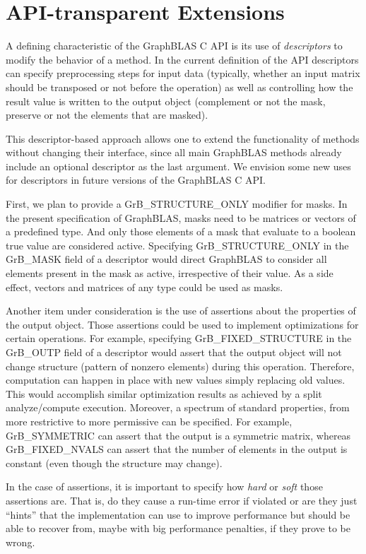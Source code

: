 \section{API-transparent Extensions}
\label{Sec:Extensions}

A defining characteristic of the GraphBLAS C API is its use of
\emph{descriptors} to modify the behavior of a method.  In the current
definition of the API descriptors can specify preprocessing steps for
input data (typically, whether an input matrix should be transposed or
not before the operation) as well as controlling how the result value
is written to the output object (complement or not the mask, preserve
or not the elements that are masked).

This descriptor-based approach allows one to extend the functionality of
methods without changing their interface, since all main GraphBLAS methods
already include an optional descriptor as the last argument. We envision
some new uses for descriptors in future versions of the GraphBLAS C API.

First, we plan to provide a {\sf GrB\_STRUCTURE\_ONLY} modifier for masks.
In the present specification of GraphBLAS, masks need to be matrices
or vectors of a predefined type. And only those elements of a mask
that evaluate to a boolean {\sf true} value are considered active.
Specifying {\sf GrB\_STRUCTURE\_ONLY} in the {\sf GrB\_MASK} field of
a descriptor would direct GraphBLAS to consider all elements present
in the mask as active, irrespective of their value.  As a side effect,
vectors and matrices of any type could be used as masks.

Another item under consideration is the use of assertions about the
properties of the output object. Those assertions could be used to
implement optimizations for certain operations. For example, specifying
{\sf GrB\_FIXED\_STRUCTURE} in the {\sf GrB\_OUTP} field of a descriptor
would assert that the output object will not change structure (pattern
of nonzero elements) during this operation. Therefore, computation
can happen in place with new values simply replacing old values. This
would accomplish similar optimization results as achieved by a split
analyze/compute execution. Moreover, a spectrum of standard properties,
from more restrictive to more permissive can be specified. For example,
{\sf GrB\_SYMMETRIC} can assert that the output is a symmetric matrix,
whereas {\sf GrB\_FIXED\_NVALS} can assert that the number of elements
in the output is constant (even though the structure may change).

In the case of assertions, it is important to specify how \emph{hard}
or \emph{soft} those assertions are. That is, do they cause a run-time
error if violated or are they just ``hints'' that the implementation
can use to improve performance but should be able to recover from,
maybe with big performance penalties, if they prove to be wrong.
